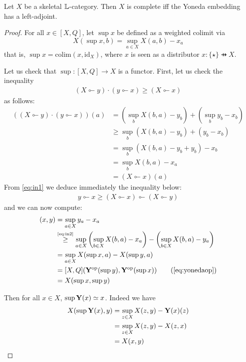 \begin{proposition}\label{prop:yonedasup}
Let $X$ be a skeletal $\mathbb{L}$-category. Then $X$ is complete iff the Yoneda embedding has a left-adjoint.
\end{proposition}
\begin{proof}
 For all $ x\in [X,Q]$, let $\sup x$ be defined as a weighted colimit via
$$
X(\sup x, b)= \sup_{a\in X} X(a,b)-x_{a}
$$
that is, $\sup  x= \mathrm{colim}(  x, \mathrm{id}_{X})$, where $ x$ is seen as a distributor $x:\{\star\}\pfun X$.


Let us check that $\sup: [X,Q]\to X$ is a functor. First, let us check the  inequality
\begin{align}\label{eq:in1}
(X\multimapinv y)\cdot ( y\multimapinv x)\geq (X\multimapinv x)\end{align}
as follows:
\begin{align*}
\left((X\multimapinv  y)\cdot ( y\multimapinv x)\right)(a)&=
 \left (\sup_{b}X(b,a)- y_{b}\right)+\left(\sup_{b} y_{b}-x_{b}\right)\\
&\geq
\sup_{b}(X(b,a)- y_{b})+( y_{b}-x_{b})
\\
&=\sup_{b}(X(b,a)- y_{b}+ y_{b})-x_{b}
\\
&=\sup_{b} X(b,a)-x_{a}\\
&= (X\multimapinv x)(a)
\end{align*}
From \eqref{eq:in1} we deduce immediately the inequality below:
\begin{align}\label{eq:in2}
 y\multimapinv x \geq (X\multimapinv x)\multimapinv(X\multimapinv y)
\end{align}
and we can now compute:
\begin{align*}
[X,Q](x,  y)&= \sup_{a\in X} y_{a}-x_{a}\\
 &\stackrel{\tiny\eqref{eq:in2}}{\geq}
 \sup_{a\in X} \left( \sup_{b\in X}X(b,a)-x_{a}\right) -\left(  \sup_{b\in X}X(b,a)- y_{a}   \right )\\
 &= \sup_{a\in X}X(\sup x, a)-X(\sup  y, a)\\
 &= [X,Q](\B Y^{\mathrm{op}}(\sup y),\B Y^{\mathrm{op}}(\sup x))
 \tag{\ref{eq:yonedaop}}
 \\
&=X(\sup x, \sup  y)
\end{align*}


Then for all $x\in X$, $\sup \mathbf{Y}(x)\simeq x$. Indeed we have 
\begin{align*}
X(\sup \mathbf{Y}(x), y) & = \sup_{z\in X}X(z,y) -\mathbf{Y}(x)(z) \\
& = \sup_{z\in X}X(z,y)-X(z,x)\\
&= X(x,y)
\end{align*}
%


\end{proof}
